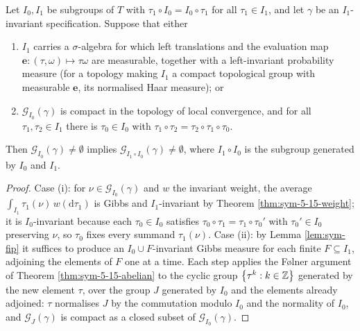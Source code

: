 \begin{theorem}[Georgii (5.15)]
    \label{thm:sym-5-15}
    \leanok

    Let $I_0, I_1$ be subgroups of $T$ with $\tau_1 \circ I_0 = I_0 \circ \tau_1$ for all
    $\tau_1 \in I_1$, and let $\gamma$ be an $I_1$-invariant specification. Suppose that either
    \begin{enumerate}
        \item $I_1$ carries a $\sigma$-algebra for which left translations and the evaluation
              map $\mathbf{e} : (\tau,\omega) \mapsto \tau\omega$ are measurable, together with
              a left-invariant probability measure (for a topology making $I_1$ a compact
              topological group with measurable $\mathbf e$, its normalised Haar measure); or
        \item $\mathcal{G}_{I_0}(\gamma)$ is compact in the topology of local convergence, and
              for all $\tau_1, \tau_2 \in I_1$ there is $\tau_0 \in I_0$ with
              $\tau_1 \circ \tau_2 = \tau_2 \circ \tau_1 \circ \tau_0$.
    \end{enumerate}
    Then $\mathcal{G}_{I_0}(\gamma) \neq \emptyset$ implies
    $\mathcal{G}_{I_1 \circ I_0}(\gamma) \neq \emptyset$, where $I_1 \circ I_0$ is the subgroup
    generated by $I_0$ and $I_1$.
\end{theorem}
\begin{proof}
    \leanok

    Case (i): for $\nu \in \mathcal{G}_{I_0}(\gamma)$ and $w$ the invariant weight, the average
    $\int_{I_1} \tau_1(\nu)\, w(\mathrm{d}\tau_1)$ is Gibbs and $I_1$-invariant by
    Theorem \ref{thm:sym-5-15-weight}; it is $I_0$-invariant because each $\tau_0 \in I_0$
    satisfies $\tau_0 \circ \tau_1 = \tau_1 \circ \tau_0'$ with $\tau_0' \in I_0$ preserving
    $\nu$, so $\tau_0$ fixes every summand $\tau_1(\nu)$.
    Case (ii): by Lemma \ref{lem:sym-fip} it suffices to produce an $I_0 \cup F$-invariant Gibbs
    measure for each finite $F \subseteq I_1$, adjoining the elements of $F$ one at a time. Each
    step applies the F\o lner argument of Theorem \ref{thm:sym-5-15-abelian} to the cyclic group
    $\left\{ \tau^k : k \in \mathbb{Z} \right\}$ generated by the new element $\tau$, over the group $J$
    generated by $I_0$ and the elements already adjoined: $\tau$ normalises $J$ by the
    commutation modulo $I_0$ and the normality of $I_0$, and $\mathcal{G}_J(\gamma)$ is compact
    as a closed subset of $\mathcal{G}_{I_0}(\gamma)$.
\end{proof}

